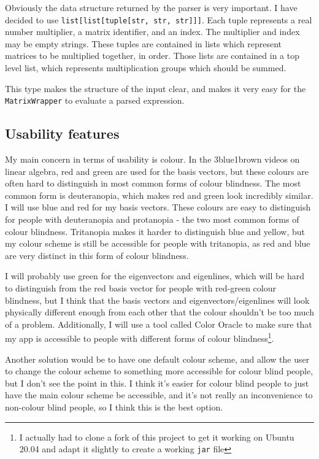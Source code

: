 \documentclass[../main.tex]{subfiles}
\begin{document}
Obviously the data structure returned by the parser is very important. I have decided to use \texttt{list[list[tuple[str, str, str]]]}. Each tuple represents a real number multiplier, a matrix identifier, and an index. The multiplier and index may be empty strings. These tuples are contained in lists which represent matrices to be multiplied together, in order. Those lists are contained in a top level list, which represents multiplication groups which should be summed.

This type makes the structure of the input clear, and makes it very easy for the \texttt{MatrixWrapper} to evaluate a parsed expression.

\subsection{Usability features\label{design:usability-features}}

My main concern in terms of usability is colour. In the 3blue1brown videos on linear algebra, red and green are used for the basis vectors, but these colours are often hard to distinguish in most common forms of colour blindness. The most common form is deuteranopia\cite{types-of-color-blindness}, which makes red and green look incredibly similar. I will use blue and red for my basis vectors. These colours are easy to distinguish for people with deuteranopia and protanopia - the two most common forms of colour blindness. Tritanopia makes it harder to distinguish blue and yellow, but my colour scheme is still be accessible for people with tritanopia, as red and blue are very distinct in this form of colour blindness.

I will probably use green for the eigenvectors and eigenlines, which will be hard to distinguish from the red basis vector for people with red-green colour blindness, but I think that the basis vectors and eigenvectors/eigenlines will look physically different enough from each other that the colour shouldn't be too much of a problem. Additionally, I will use a tool called Color Oracle\cite{colororacle.org} to make sure that my app is accessible to people with different forms of colour blindness\footnote{I actually had to clone a fork of this project\cite{color-oracle-dorkbox-fork} to get it working on Ubuntu 20.04 and adapt it slightly to create a working \texttt{jar} file\cite{color-oracle-my-fork}}.

Another solution would be to have one default colour scheme, and allow the user to change the colour scheme to something more accessible for colour blind people, but I don't see the point in this. I think it's easier for colour blind people to just have the main colour scheme be accessible, and it's not really an inconvenience to non-colour blind people, so I think this is the best option.
\end{document}
